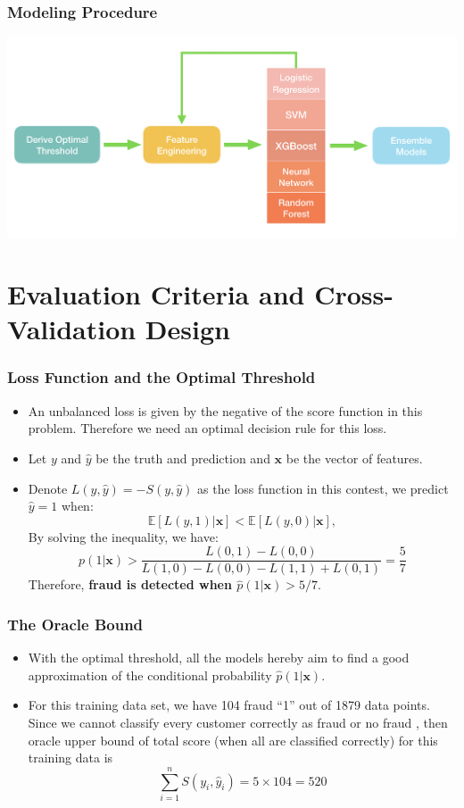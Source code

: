 \documentclass{beamer}
\begin{document}
\begin{frame}
\frametitle{Modeling Procedure}
    \includegraphics[width = \textwidth]{figure/FlowChart.png}
\end{frame}
\section{Evaluation Criteria and Cross-Validation Design}



\begin{frame}
\frametitle{{Loss Function and the Optimal Threshold}}
    \begin{itemize}
        \item 
        An unbalanced loss is given by the negative of the score function in this problem. Therefore we need an optimal decision rule for this loss. 
        \item  Let $y$ and $\hat{y}$ be the truth and prediction and $\bm x$ be the vector of features. 
        \item Denote $L(y, \hat{y}) = - S(y, \hat{y})$ as the loss function in this contest,  we predict $\hat{y}=1$ when: 
  $$\mathbb{E}[{L}({y}, 1) | \bm{x}]<\mathbb{E}[{L}({y}, 0) | \bm{x}],$$
By solving the inequality, we have:
$$
{p}(1 | \bm {x})>\frac{{L}(0,1)-{L}(0,0)}{{L}(1,0)-{L}(0,0)-{L}(1,1)+{L}(0,1)} = \frac{5}{7}
$$
Therefore, \textbf{fraud is detected when ${\hat{p}(1|\bm x)>5/7}$}.
    
    \end{itemize}

   
    
\end{frame}

\begin{frame}
    \frametitle{The Oracle Bound}
\begin{itemize}
    \item With the optimal threshold, all the models hereby aim to find a good approximation of the conditional probability $\hat{p}(1|\bm x)$.
    \item For this training data set, we have 104 fraud “1” out of 1879 data points. Since we cannot classify every customer correctly as fraud or no fraud , then oracle upper bound of total score (when all are classified correctly) for this training data is
    \[\sum_{i=1}^n S(y_i, \hat{y}_i) = 5 \times 104 = 520\]
\end{itemize}
\end{frame}
\end{document}
